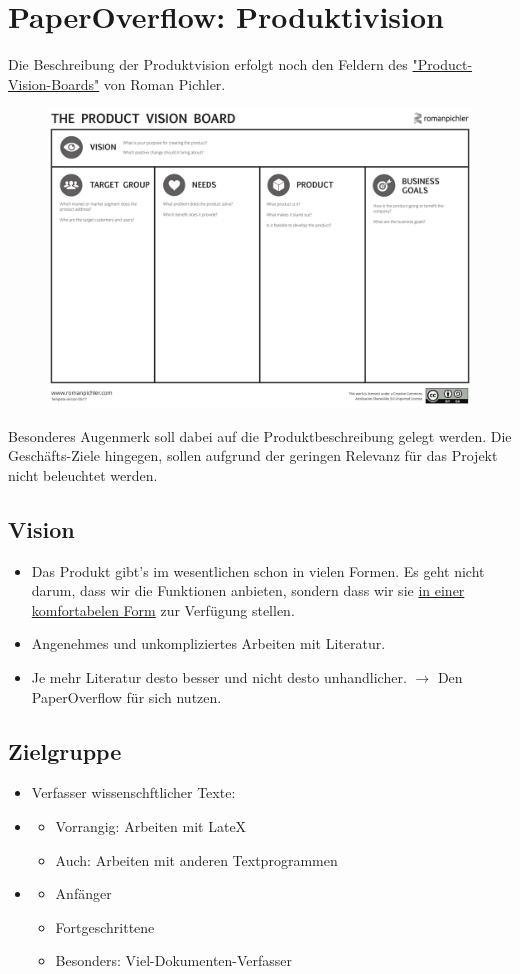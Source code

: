 \documentclass[a4paper,12pt]{article}
\begin{document}
\section{PaperOverflow: Produktivision}
Die Beschreibung der Produktvision erfolgt noch den Feldern des  \href{http://www.romanpichler.com/tools/vision-board/}{"Product-Vision-Boards"} von Roman Pichler. 
\begin{figure}[h!]
  \centering
  \includegraphics[width=0.7\linewidth]{res/PVB.pdf}
\end{figure}

Besonderes Augenmerk soll dabei auf die Produktbeschreibung gelegt werden.
Die Geschäfts-Ziele hingegen, sollen aufgrund der geringen Relevanz für das Projekt nicht beleuchtet werden.
\subsection{Vision}
\begin{itemize}
\item Das Produkt gibt's im wesentlichen schon in vielen Formen. Es geht nicht darum, dass wir die Funktionen anbieten, sondern dass wir sie \underline{in einer komfortabelen Form} zur Verfügung stellen.
\item Angenehmes und unkompliziertes Arbeiten mit Literatur.
\item Je mehr Literatur desto besser und nicht desto unhandlicher. $\to$ Den PaperOverflow für sich nutzen.
\end{itemize}

\subsection{Zielgruppe}
\begin{itemize}
\item Verfasser wissenschftlicher Texte:
\item \begin{itemize}
	\item Vorrangig: Arbeiten mit LateX
	\item Auch: Arbeiten mit anderen Textprogrammen
\end{itemize}
\item \begin{itemize}
	\item Anfänger
	\item Fortgeschrittene
	\item Besonders: Viel-Dokumenten-Verfasser
\end{itemize}
\end{itemize}
\end{document}
